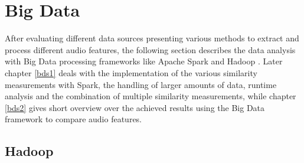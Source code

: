 
\section{Big Data}\label{bdf}

After evaluating different data sources presenting various methods to extract and process different audio features, the following section describes the data analysis with Big Data processing frameworks like Apache Spark \cite{spark} and Hadoop \cite{hadoop}. Later chapter \ref{bds1} deals with the implementation of the various similarity measurements with Spark, the handling of larger amounts of data, runtime analysis and the combination of multiple similarity measurements, while chapter \ref{bds2} gives short overview over the achieved results using the Big Data framework to compare audio features. 

\subsection{Hadoop}


